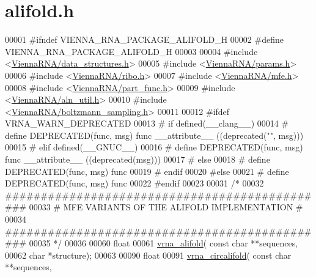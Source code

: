 \hypertarget{alifold_8h_source}{}\section{alifold.\+h}
\label{alifold_8h_source}

\begin{DoxyCode}
00001 \textcolor{preprocessor}{#ifndef VIENNA\_RNA\_PACKAGE\_ALIFOLD\_H}
00002 \textcolor{preprocessor}{#define VIENNA\_RNA\_PACKAGE\_ALIFOLD\_H}
00003 
00004 \textcolor{preprocessor}{#include <\hyperlink{data__structures_8h}{ViennaRNA/data\_structures.h}>}
00005 \textcolor{preprocessor}{#include <\hyperlink{params_8h}{ViennaRNA/params.h}>}
00006 \textcolor{preprocessor}{#include <\hyperlink{ribo_8h}{ViennaRNA/ribo.h}>}
00007 \textcolor{preprocessor}{#include <\hyperlink{mfe_8h}{ViennaRNA/mfe.h}>}
00008 \textcolor{preprocessor}{#include <\hyperlink{part__func_8h}{ViennaRNA/part\_func.h}>}
00009 \textcolor{preprocessor}{#include <\hyperlink{aln__util_8h}{ViennaRNA/aln\_util.h}>}
00010 \textcolor{preprocessor}{#include <\hyperlink{boltzmann__sampling_8h}{ViennaRNA/boltzmann\_sampling.h}>}
00011 
00012 \textcolor{preprocessor}{#ifdef VRNA\_WARN\_DEPRECATED}
00013 \textcolor{preprocessor}{# if defined(\_\_clang\_\_)}
00014 \textcolor{preprocessor}{#  define DEPRECATED(func, msg) func \_\_attribute\_\_ ((deprecated("", msg)))}
00015 \textcolor{preprocessor}{# elif defined(\_\_GNUC\_\_)}
00016 \textcolor{preprocessor}{#  define DEPRECATED(func, msg) func \_\_attribute\_\_ ((deprecated(msg)))}
00017 \textcolor{preprocessor}{# else}
00018 \textcolor{preprocessor}{#  define DEPRECATED(func, msg) func}
00019 \textcolor{preprocessor}{# endif}
00020 \textcolor{preprocessor}{#else}
00021 \textcolor{preprocessor}{# define DEPRECATED(func, msg) func}
00022 \textcolor{preprocessor}{#endif}
00023 
00031 \textcolor{comment}{/*}
00032 \textcolor{comment}{##############################################}
00033 \textcolor{comment}{# MFE VARIANTS OF THE ALIFOLD IMPLEMENTATION #}
00034 \textcolor{comment}{##############################################}
00035 \textcolor{comment}{*/}
00036 
00060 \textcolor{keywordtype}{float}
00061 \hyperlink{group__consensus__mfe__fold_ga6c9d3bef3e92c6d423ffac9f981418c1}{vrna\_alifold}( \textcolor{keyword}{const} \textcolor{keywordtype}{char} **sequences,
00062               \textcolor{keywordtype}{char} *structure);
00063 
00090 \textcolor{keywordtype}{float}
00091 \hyperlink{group__consensus__mfe__fold_ga17a1be7490468c29c335ba9bffacba53}{vrna\_circalifold}( \textcolor{keyword}{const} \textcolor{keywordtype}{char} **sequences,

\end{DoxyCode}
